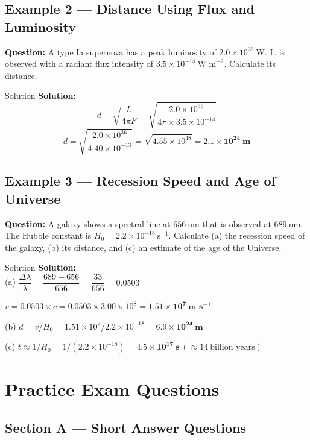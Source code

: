 \subsection*{Example 2 — Distance Using Flux and Luminosity}

\textbf{Question:} A type Ia supernova has a peak luminosity of $2.0\times10^{36}\ \text{W}$. It is observed with a radiant flux intensity of $3.5\times10^{-14}\ \text{W m}^{-2}$. Calculate its distance.

\begin{examplebox}{Solution}
\textbf{Solution:}\\
$$d = \sqrt{\frac{L}{4\pi F}} = \sqrt{\frac{2.0\times10^{36}}{4\pi \times 3.5\times10^{-14}}}$$
$$d = \sqrt{\frac{2.0\times10^{36}}{4.40\times10^{-13}}} = \sqrt{4.55\times10^{48}} = \mathbf{2.1\times10^{24}\ \text{m}}$$
\end{examplebox}

\subsection*{Example 3 — Recession Speed and Age of Universe}

\textbf{Question:} A galaxy shows a spectral line at $656\ \text{nm}$ that is observed at $689\ \text{nm}$. The Hubble constant is $H_0 = 2.2\times10^{-18}\ \text{s}^{-1}$. Calculate (a) the recession speed of the galaxy, (b) its distance, and (c) an estimate of the age of the Universe.

\begin{examplebox}{Solution}
\textbf{Solution:}\\
(a) $\dfrac{\Delta\lambda}{\lambda} = \dfrac{689 - 656}{656} = \dfrac{33}{656} = 0.0503$

$v = 0.0503 \times c = 0.0503 \times 3.00\times10^8 = \mathbf{1.51\times10^7\ \text{m s}^{-1}}$

(b) $d = v/H_0 = 1.51\times10^7 / 2.2\times10^{-18} = \mathbf{6.9\times10^{24}\ \text{m}}$

(c) $t \approx 1/H_0 = 1/(2.2\times10^{-18}) = \mathbf{4.5\times10^{17}\ \text{s}}\ (\approx 14\ \text{billion years})$
\end{examplebox}

\section{Practice Exam Questions}

\subsection*{Section A — Short Answer Questions}

